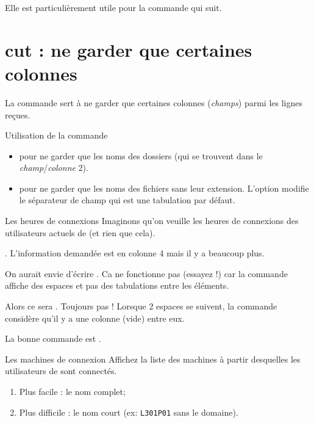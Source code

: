 \documentclass[a4paper,11pt]{style-esi/td}
\begin{document}
		Elle est particulièrement utile pour la commande qui suit.

	\section{cut  : ne garder que certaines colonnes}
	
		La commande  sert à ne garder que certaines colonnes 
		(\emph{champs})
		parmi les lignes reçues.

		\begin{Exemple}{Utilisation de la commande }
			\begin{itemize}
			\item 
				pour ne garder que les noms des dossiers 
				(qui se trouvent dans le \emph{champ}/\emph{colonne} 2).
			\item 
				pour ne garder que les noms des fichiers sans leur extension.
				L'option  modifie le séparateur de champ
				qui est une tabulation par défaut.
			\end{itemize}
		\end{Exemple}

		\begin{Experience}{Les heures de connexions}
			Imaginons qu'on veuille les heures 
			de connexions des utilisateurs actuels de 
			(et rien que cela).
			\begin{steps}
			\item 
				. 
				L'information demandée est en colonne 4 mais il y a beaucoup plus.
			\item 
				On aurait envie d'écrire .
				Ca ne fonctionne pas (essayez !)
				car la commande affiche des espaces
				et pas des tabulations entre les éléments.
			\item 
				Alors ce sera .
				Toujours pas !
				Lorsque 2 espaces se suivent,
				la commande considère qu'il y a une colonne (vide) entre eux.
			\item 
				La bonne commande est .
			\end{steps}
		\end{Experience}

		\begin{Exercice}{Les machines de connexion}
			Affichez la liste des machines à partir desquelles les utilisateurs
			de  sont connectés.
			\begin{enumerate}[label=\alph*)]
				\item Plus facile : le nom complet;
				\item Plus difficile : le nom court 
					(ex: \verb_L301P01_ sans le domaine).
			\end{enumerate} 
		\end{Exercice}
\end{document}
